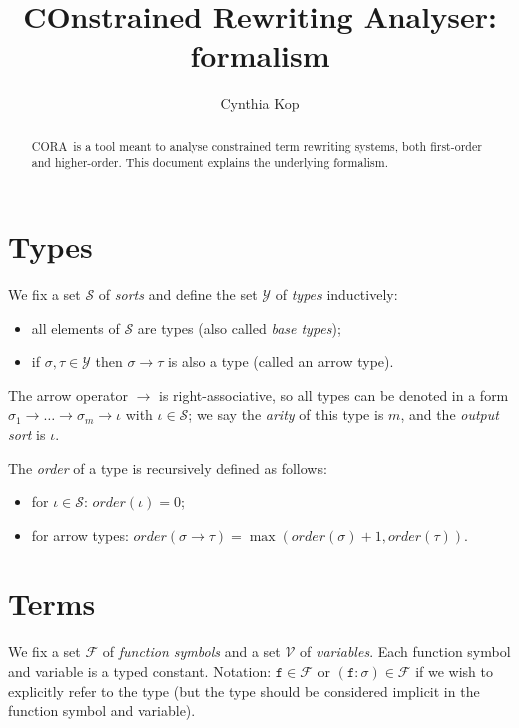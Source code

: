 \documentclass{lmcs}
\theoremstyle{theorem}\newtheorem{theorem}{Theorem}
\theoremstyle{theorem}\newtheorem{lemma}[theorem]{Lemma}
\theoremstyle{theorem}\newtheorem{corollary}[theorem]{Corollary}
\theoremstyle{definition}\newtheorem{definition}[theorem]{Definition}
\theoremstyle{definition}\newtheorem{example}[theorem]{Example}
\newcommand{\F}{\mathcal{F}}
\newcommand{\V}{\mathcal{V}}
\newcommand{\Sorts}{\mathcal{S}}
\newcommand{\Types}{\mathcal{Y}}
\newcommand{\order}{\mathit{order}}
\newcommand{\asort}{\iota}
\newcommand{\atype}{\sigma}
\newcommand{\btype}{\tau}
\newcommand{\identifier}[1]{\mathtt{#1}}
\newcommand{\afun}{\identifier{f}}
\newcommand{\arrtype}{\rightarrow}
\newcommand{\cora}{\textsf{CORA}\xspace}
\begin{document}
\title{COnstrained Rewriting Analyser: formalism}
\author{Cynthia Kop}
\address{Department of Software Science, Radboud University Nijmegen}

\maketitle

\begin{abstract}
\cora\ is a tool meant to analyse constrained term rewriting systems, both
first-order and higher-order.  This document explains the underlying formalism.
\end{abstract}

\section{Types}

We fix a set $\Sorts$ of \emph{sorts} and define the set $\Types$ of \emph{types} inductively:
\begin{itemize}
\item all elements of $\Sorts$ are types (also called \emph{base types});
\item if $\atype,\btype \in \Types$ then $\atype \arrtype \btype$ is also a type (called an arrow
  type).
\end{itemize}
The arrow operator $\arrtype$ is right-associative, so all types can be denoted in a form
$\atype_1 \arrtype \dots \arrtype \atype_m \arrtype \asort$ with $\asort \in \Sorts$; we say the
\emph{arity} of this type is $m$, and the \emph{output sort} is $\asort$.

The \emph{order} of a type is recursively defined as follows:
\begin{itemize}
\item for $\asort \in \Sorts$: $\order(\asort) = 0$;
\item for arrow types: $\order(\atype \arrtype \btype) = \max(\order(\atype) + 1,\order(\btype))$.
\end{itemize}

\section{Terms}

We fix a set $\F$ of \emph{function symbols} and a set $\V$ of \emph{variables}.  Each function
symbol and variable is a typed constant.  Notation: $\afun \in \F$ or $(\afun : \atype) \in \F$
if we wish to explicitly refer to the type (but the type should be considered implicit in the
function symbol and variable).
\end{document}
